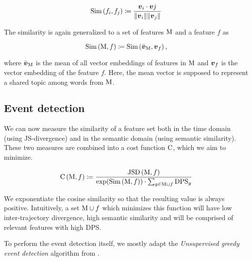 \begin{equation}
	\semsim \left( f_{i}, f_{j} \right) \coloneqq \frac{\embed_{i} \cdot \embed{j}}{\| \embed_{i} \| \| \embed_{j} \|}
\end{equation}

The similarity is again generalized to a set of features $\text{M}$ and a feature $f$ as

\begin{equation}
	\semsim \left( \featset, f \right) \coloneqq \semsim \left( \bar{\embed}_{\featset}, \embed_{f} \right),
\end{equation}

where $\bar{\embed}_{\featset}$ is the mean of all vector embeddings of features in $\text{M}$ and $\embed_{f}$ is the vector embedding of the feature $f$. Here, the mean vector is supposed to represent a shared topic among words from $\text{M}$.


\subsection{Event detection}

We can now measure the similarity of a feature set both in the time domain (using JS-divergence) and in the semantic domain (using semantic similarity). These two measures are combined into a cost function $\text{C}$, which we aim to minimize.

\begin{equation} \label{eq:cost-function}
	\text{C} \left( \text{M}, f \right) \coloneqq \frac{\text{JSD} \left( \text{M}, f \right)}{\exp(\text{Sim} \left( \text{M}, f \right)) \cdot \sum_{g \in \text{M} \cup f}{\text{DPS}_{g}}}
\end{equation}

We exponentiate the cosine similarity so that the resulting value is always positive. Intuitively, a set $\text{M} \cup f$ which minimizes this function will have low inter-trajectory divergence, high semantic similarity and will be comprised of relevant features with high DPS.

To perform the event detection itself, we mostly adapt the \textit{Unsupervised greedy event detection} algorithm from \cite{event-detection}.

